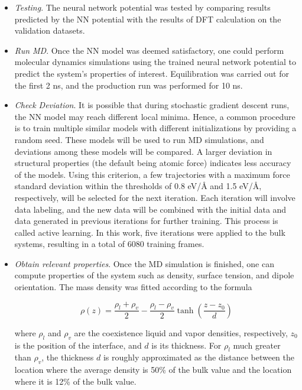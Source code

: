 \begin{itemize}
    \item \emph{Testing}. The neural network potential was tested by
          comparing results predicted by the NN potential with	  the results
          of DFT
          calculation on the validation datasets.

    \item \emph{Run MD}.
          Once the NN model was deemed satisfactory, one could perform molecular dynamics simulations using the trained neural network potential to predict the system's properties of interest. Equilibration was carried out for the first 2 ns, and the production run was performed for 10 ns.

    \item \emph{Check Deviation}.
          It is possible that during stochastic gradient descent runs, the NN model may reach different local minima. Hence, a common procedure is to train multiple similar models with different initializations by providing a random seed. These models will be used to run MD simulations, and deviations among these models will be compared. A larger deviation in structural properties (the default being atomic force) indicates less accuracy of the models. Using this criterion, a few trajectories with a maximum force standard deviation within the thresholds of 0.8 \unit{eV/\angstrom} and 1.5 \unit{eV/\angstrom}, respectively, will be selected for the next iteration. Each iteration will involve data labeling, and the new data will be combined with the initial data and data generated in previous iterations for further training. This process is called active learning. In this work, five iterations were applied to the bulk systems, resulting in a total of 6080 training frames.

    \item \emph{Obtain relevant properties}.
          Once the MD simulation is finished, one can compute properties of the system such as density, surface tension, and dipole orientation. The mass density was fitted according to the formula~\cite{sanchez2023deep}

          \begin{equation} \rho(z) = \frac{\rho_l + \rho_v}{2} - \frac{\rho_l - \rho_v}{2} \tanh\left(\frac{z - z_0}{d}\right) \label{eq:fit_dens}
          \end{equation}

          where $\rho_l$ and $\rho_v$ are the coexistence liquid and vapor densities, respectively, $z_0$ is the position of the interface, and $d$ is its thickness. For $\rho_l$ much greater than $\rho_v$, the thickness $d$ is roughly approximated as the distance between the location where the average density is 50\% of the bulk value and the location where it is 12\% of the bulk value.


\end{itemize}
